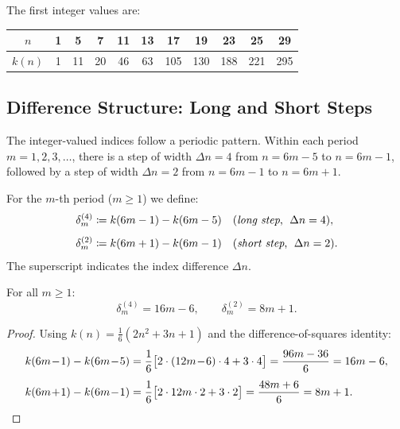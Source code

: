 The first integer values are:

\begin{center}
\begin{tabular}{c*{10}{c}}
\toprule
$n$ & 1 & 5 & 7 & 11 & 13 & 17 & 19 & 23 & 25 & 29 \\
\midrule
$k(n)$ & 1 & 11 & 20 & 46 & 63 & 105 & 130 & 188 & 221 & 295 \\
\bottomrule
\end{tabular}
\end{center}

\subsection{Difference Structure: Long and Short Steps}\label{subsec:steps}

The integer-valued indices follow a periodic pattern. Within each
period $m = 1, 2, 3, \ldots$, there is a step of width $\Delta n = 4$
from $n = 6m-5$ to $n = 6m-1$, followed by a step of width
$\Delta n = 2$ from $n = 6m-1$ to $n = 6m+1$.

\begin{definition}\label{def:steps}
For the $m$-th period ($m \geq 1$) we define:
\begin{align}
  \delta^{(4)}_m &\coloneqq k(6m-1) - k(6m-5)
  \quad\text{(\emph{long step},\; $\Delta n = 4$)},
  \label{eq:long}\\[4pt]
  \delta^{(2)}_m &\coloneqq k(6m+1) - k(6m-1)
  \quad\text{(\emph{short step},\; $\Delta n = 2$)}.
  \label{eq:short}
\end{align}
The superscript indicates the index difference $\Delta n$.
\end{definition}

\begin{theorem}\label{thm:step-formulae}
For all $m \geq 1$:
\begin{equation}\label{eq:step-formulae}
  \delta^{(4)}_m = 16m - 6,
  \qquad
  \delta^{(2)}_m = 8m + 1.
\end{equation}
\end{theorem}

\begin{proof}
Using $k(n) = \frac{1}{6}(2n^2+3n+1)$ and the difference-of-squares identity:
\begin{align*}
  k(6m\!-\!1) - k(6m\!-\!5)
  &= \frac{1}{6}\bigl[2\cdot(12m\!-\!6)\cdot 4 + 3\cdot 4\bigr]
  = \frac{96m-36}{6} = 16m-6,\\[4pt]
  k(6m\!+\!1) - k(6m\!-\!1)
  &= \frac{1}{6}\bigl[2\cdot 12m\cdot 2 + 3\cdot 2\bigr]
  = \frac{48m+6}{6} = 8m+1.
  \qedhere
\end{align*}
\end{proof}

